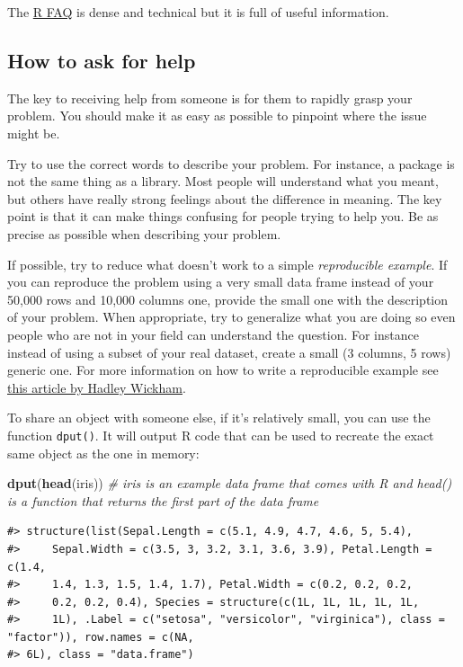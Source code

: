 \documentclass[]{book}
\newenvironment{Shaded}{\begin{snugshade}}{\end{snugshade}}
\newcommand{\KeywordTok}[1]{\textcolor[rgb]{0.13,0.29,0.53}{\textbf{#1}}}
\newcommand{\CommentTok}[1]{\textcolor[rgb]{0.56,0.35,0.01}{\textit{#1}}}
\newcommand{\NormalTok}[1]{#1}
\begin{document}
The \href{http://cran.r-project.org/doc/FAQ/R-FAQ.html}{R FAQ} is dense
and technical but it is full of useful information.

\subsection{How to ask for help}\label{how-to-ask-for-help}

The key to receiving help from someone is for them to rapidly grasp your
problem. You should make it as easy as possible to pinpoint where the
issue might be.

Try to use the correct words to describe your problem. For instance, a
package is not the same thing as a library. Most people will understand
what you meant, but others have really strong feelings about the
difference in meaning. The key point is that it can make things
confusing for people trying to help you. Be as precise as possible when
describing your problem.

If possible, try to reduce what doesn't work to a simple
\emph{reproducible example}. If you can reproduce the problem using a
very small data frame instead of your 50,000 rows and 10,000 columns
one, provide the small one with the description of your problem. When
appropriate, try to generalize what you are doing so even people who are
not in your field can understand the question. For instance instead of
using a subset of your real dataset, create a small (3 columns, 5 rows)
generic one. For more information on how to write a reproducible example
see \href{http://adv-r.had.co.nz/Reproducibility.html}{this article by
Hadley Wickham}.

To share an object with someone else, if it's relatively small, you can
use the function \texttt{dput()}. It will output R code that can be used
to recreate the exact same object as the one in memory:

\begin{Shaded}
\begin{Highlighting}[]
\KeywordTok{dput}\NormalTok{(}\KeywordTok{head}\NormalTok{(iris)) }\CommentTok{# iris is an example data frame that comes with R and head() is a function that returns the first part of the data frame}
\end{Highlighting}
\end{Shaded}

\begin{verbatim}
#> structure(list(Sepal.Length = c(5.1, 4.9, 4.7, 4.6, 5, 5.4), 
#>     Sepal.Width = c(3.5, 3, 3.2, 3.1, 3.6, 3.9), Petal.Length = c(1.4, 
#>     1.4, 1.3, 1.5, 1.4, 1.7), Petal.Width = c(0.2, 0.2, 0.2, 
#>     0.2, 0.2, 0.4), Species = structure(c(1L, 1L, 1L, 1L, 1L, 
#>     1L), .Label = c("setosa", "versicolor", "virginica"), class = "factor")), row.names = c(NA, 
#> 6L), class = "data.frame")
\end{verbatim}
\end{document}
